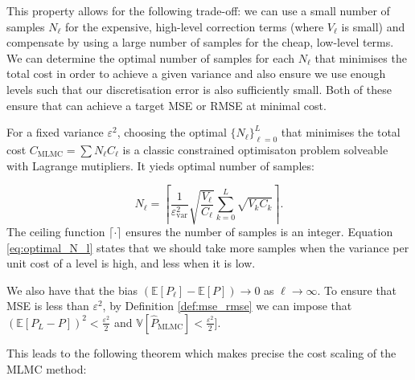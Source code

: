 This property allows for the following trade-off: we can use a small number of samples $N_\ell$ 
for the expensive, high-level correction terms (where $V_\ell$ is small) and compensate 
by using a large number of samples for the cheap, low-level terms. We can determine the 
optimal number of samples for each $N_\ell$ that minimises the total cost in order 
to achieve a given variance and also ensure we use enough levels such that our discretisation error 
is also sufficiently small. Both of these ensure that can achieve a target MSE or RMSE at minimal cost.

For a fixed variance $\varepsilon^2$, choosing the optimal $\{N_\ell\}_{\ell=0}^L$ that 
minimises the total cost $C_{\textrm{MLMC}} = \sum N_\ell C_\ell$ is a classic 
constrained optimisaton problem solveable with Lagrange mutipliers. It yieds 
optimal number of samples:

\begin{equation}\label{eq:optimal_N_l}
    N_\ell = \left\lceil \frac{1}{\varepsilon_{\text{var}}^2} \sqrt{\frac{V_\ell}{C_\ell}} \sum_{k=0}^L \sqrt{V_k C_k} \right\rceil.
\end{equation}
The ceiling function $\lceil \cdot \rceil$ ensures the number of samples is an integer.
Equation \eqref{eq:optimal_N_l} states that we should take more samples when the 
variance per unit cost of a level is high, and less when it is low.


We also have that the bias $(\mathbb{E}[P_\ell] - \mathbb{E}[P]) \to 0$ as $\ell \to \infty$. 
To ensure that MSE is less than $\varepsilon^2$, by Definition \ref{def:mse_rmse} we can 
impose that 
$(\mathbb{E}[P_L  - P])^2 < \frac{\varepsilon^2}{2}$ and 
$\mathbb{V}[\hat{P}_{\mathrm{MLMC}}] < \frac{\varepsilon^2}{2}]$. 

This leads to the following theorem \cite{giles2015multilevel} which makes 
precise the cost scaling of the MLMC method:

